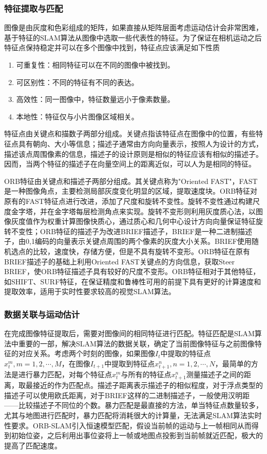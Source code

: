 \subsubsection*{特征提取与匹配}
图像是由灰度和色彩组成的矩阵，如果直接从矩阵层面考虑运动估计会非常困难，基于特征的SLAM算法从图像中选取一些代表性的特征。为了保证在相机运动之后特征点保持稳定并可以在多个图像中找到，特征点应该满足如下性质
\begin{enumerate}[label={(\arabic*)}]
\item 可重复性：相同特征可以在不同的图像中被找到。
\item 可区别性：不同的特征有不同的表达。
\item 高效性：同一图像中，特征数量远小于像素数量。
\item 本地性：特征仅与小片图像区域相关。
\end{enumerate}

特征点由关键点和描数子两部分组成。关键点指该特征点在图像中的位置，有些特征点具有朝向、大小等信息；描述子通常由方向向量表示，按照人为设计的方式，描述该点周围像素的信息，描述子的设计原则是相似的特征应该有相似的描述子。因而，当两个特征的描述子在向量空间上的距离近似，可以人为是相同的特征。

ORB特征由关键点和描述子两部分组成。其关键点称为"Oriented FAST"，FAST是一种图像角点\upcite{[3.10]}，主要检测局部灰度变化明显的区域，提取速度块。ORB特征对原有的FAST特征点进行改进，添加了尺度和旋转不变性。旋转不变性通过构建尺度金字塔，并在金字塔每层检测角点来实现。旋转不变形则利用灰度质心法，以图像灰度值作为权重计算图像快质心，通过质心和几何中心设计方向向量保证特征旋转不变性；ORB特征的描述子为改进BRIEF描述子，BRIEF是一种二进制描述子\upcite{[3.11]}，由0,1编码的向量表示关键点周围的两个像素的灰度大小关系。BRIEF使用随机选点的比较，速度快，存储方便，但是不具有旋转不变形。ORB特征在原有BRIEF描述子的基础上利用Oriented FAST关键点的方向信息，获取Steer BRIEF，使ORB特征描述子具有较好的尺度不变形。ORB特征相对于其他特征，如SHIFT、SURF特征，在保证精度和鲁棒性可用的前提下具有更好的计算速度和提取效率，适用于实时性要求较高的视觉SLAM算法。

\subsubsection*{数据关联与运动估计}
在完成图像特征提取后，需要对图像间的相同特征进行匹配。特征匹配是SLAM算法中重要的一部，解决SLAM算法的数据关联，确定了当前图像特征与之前图像特征的对应关系。考虑两个时刻的图像，如果图像$I_t$中提取的特征点$x_t^m,m=1,2,\cdots,M$，在图像$I_{t+1}$中提取到特征点$x_{t+1}^n,n=1,2,\cdots,N$，最简单的方法是进行暴力匹配，对每个特征点$x_t^m$与所有的特征点$x_{t+1}^n$测量描述子之间的距离，取最接近的作为匹配点。描述子距离表示描述子的相似程度，对于浮点类型的描述子可以使用欧氏距离，对于BRIEF这样的二进制描述子，一般使用汉明距——比较描述子不同位的个数。暴力匹配是最直接的方法，单当特征点数量较多，尤其与地图进行匹配时，暴力匹配将消耗很大的计算量，无法满足SLAM算法实时性要求。ORB-SLAM引入恒速模型匹配，假设当前帧的运动与上一帧相同从而得到初始位姿，之后利用出事位姿将上一帧或地图点投影到当前帧就近匹配，极大的提高了匹配速度。

